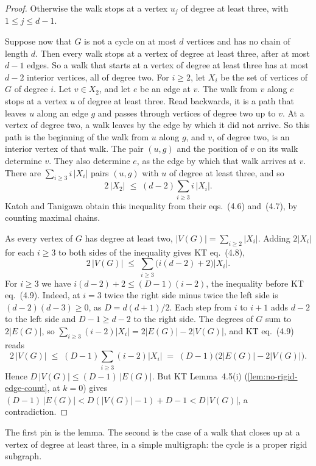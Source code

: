 \begin{proof}
  Otherwise the walk stops at a vertex $u_j$ of degree at least three,
  with $1 \le j \le d - 1$.

  Suppose now that $G$ is not a cycle on at most $d$ vertices and has no
  chain of length $d$. Then every walk stops at a vertex of degree at
  least three, after at most $d - 1$ edges. So a walk that starts at a
  vertex of degree at least three has at most $d - 2$ interior vertices,
  all of degree two. For $i \ge 2$, let $X_i$ be the set of vertices of
  $G$ of degree $i$. Let $v \in X_2$, and let $e$ be an edge at $v$. The
  walk from $v$ along $e$ stops at a vertex $u$ of degree at least three.
  Read backwards, it is a path that leaves $u$ along an edge $g$ and
  passes through vertices of degree two up to $v$. At a vertex of degree
  two, a walk leaves by the edge by which it did not arrive. So this path
  is the beginning of the walk from $u$ along $g$, and $v$, of degree
  two, is an interior vertex of that walk. The pair $(u, g)$ and the
  position of $v$ on its walk determine $v$. They also determine $e$, as
  the edge by which that walk arrives at $v$. There are
  $\sum_{i \ge 3} i\,|X_i|$ pairs $(u, g)$ with $u$ of degree at least
  three, and so
  \[
    2\,|X_2| \;\le\; (d-2) \sum_{i \ge 3} i\,|X_i|.
  \]
  Katoh and Tanigawa obtain this inequality from their eqs.~(4.6)
  and~(4.7), by counting maximal chains.

  As every vertex of $G$ has degree at least two,
  $|V(G)| = \sum_{i \ge 2} |X_i|$. Adding $2|X_i|$ for each $i \ge 3$ to
  both sides of the inequality gives KT eq.~(4.8),
  \[
    2\,|V(G)| \;\le\; \sum_{i \ge 3} \bigl(i(d-2) + 2\bigr)|X_i|.
  \]
  For $i \ge 3$ we have $i(d-2) + 2 \le (D-1)(i-2)$, the inequality
  before KT eq.~(4.9). Indeed, at $i = 3$ twice the right side minus
  twice the left side is $(d-2)(d-3) \ge 0$, as $D = d(d+1)/2$. Each step
  from $i$ to $i + 1$ adds $d - 2$ to the left side and $D - 1 \ge d - 2$
  to the right side. The degrees of $G$ sum to $2|E(G)|$, so
  $\sum_{i \ge 3} (i-2)|X_i| = 2|E(G)| - 2|V(G)|$, and KT eq.~(4.9) reads
  \[
    2\,|V(G)| \;\le\; (D-1) \sum_{i \ge 3} (i-2)|X_i|
    \;=\; (D-1)\bigl(2|E(G)| - 2|V(G)|\bigr).
  \]
  Hence $D\,|V(G)| \le (D-1)\,|E(G)|$. But KT Lemma~4.5(i)
  (\cref{lem:no-rigid-edge-count}, at $k = 0$) gives
  $(D-1)\,|E(G)| < D(|V(G)| - 1) + D - 1 < D\,|V(G)|$, a contradiction.
\end{proof}
\begin{fmlnote}
  The first pin is the lemma. The second is the case of a walk that
  closes up at a vertex of degree at least three, in a simple
  multigraph: the cycle is a proper rigid subgraph.
\end{fmlnote}

